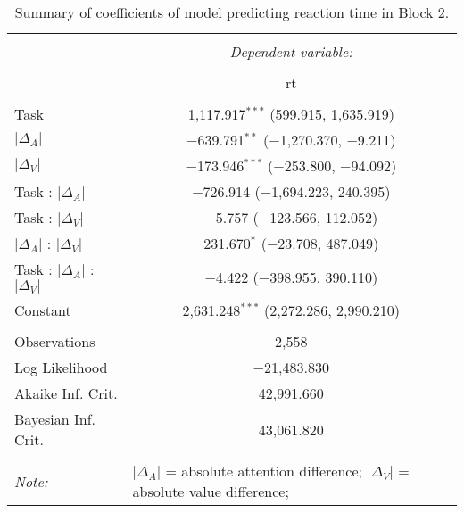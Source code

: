 
\begin{table}[b!] \centering 
  \caption{Summary of coefficients of model predicting reaction time in Block 2.} 
  \label{table:rtModelBlock2} 
\begin{tabular}{@{\extracolsep{5pt}}lc} 
\\[-1.8ex]\hline 
\hline \\[-1.8ex] 
 & \multicolumn{1}{c}{\textit{Dependent variable:}} \\ 
\cline{2-2} 
\\[-1.8ex] & rt \\ 
\hline \\[-1.8ex] 
 Task & 1,117.917$^{***}$ (599.915, 1,635.919) \\ 
  $\vert\Delta_A\vert$ & $-$639.791$^{**}$ ($-$1,270.370, $-$9.211) \\ 
  $\vert\Delta_V\vert$ & $-$173.946$^{***}$ ($-$253.800, $-$94.092) \\ 
  Task : $\vert\Delta_A\vert$ & $-$726.914 ($-$1,694.223, 240.395) \\ 
  Task : $\vert\Delta_V\vert$ & $-$5.757 ($-$123.566, 112.052) \\ 
  $\vert\Delta_A\vert$ : $\vert\Delta_V\vert$ & 231.670$^{*}$ ($-$23.708, 487.049) \\ 
  Task : $\vert\Delta_A\vert$ :  $\vert\Delta_V\vert$ & $-$4.422 ($-$398.955, 390.110) \\ 
  Constant & 2,631.248$^{***}$ (2,272.286, 2,990.210) \\ 
 \hline \\[-1.8ex] 
Observations & 2,558 \\ 
Log Likelihood & $-$21,483.830 \\ 
Akaike Inf. Crit. & 42,991.660 \\ 
Bayesian Inf. Crit. & 43,061.820 \\ 
\hline 
\hline \\[-1.8ex] 
\textit{Note:}  & \multicolumn{1}{l}{\footnotesize $\vert\Delta_A\vert$ = absolute attention difference; $\vert\Delta_V\vert$ = absolute value difference; } \\ 
\end{tabular} 
\end{table} 
